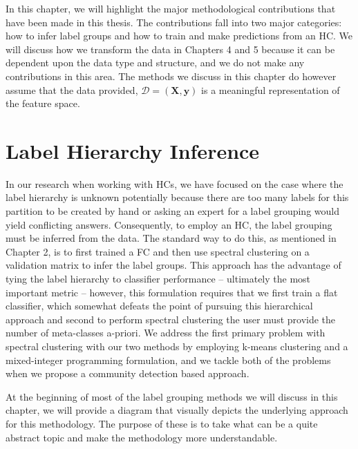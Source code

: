 \documentclass[../thesis.tex]{subfiles}
\begin{document}
In this chapter, we will highlight the major methodological contributions that
have been made in this thesis. The contributions fall into two major categories:
how to infer label groups and how to train and make predictions from an HC. We
will discuss how we transform the data in Chapters 4 and 5 because it can be
dependent upon the data type and structure, and we do not make any contributions
in this area. The methods we discuss in this chapter do however assume that the
data provided, $\mathcal{D} = (\mathbf{X}, \mathbf{y})$ is a meaningful
representation of the feature space.

\section{Label Hierarchy Inference}
In our research when working with HCs, we have focused on the case where the
label hierarchy is unknown potentially because there are too many labels for
this partition to be created by hand or asking an expert for a label grouping
would yield conflicting answers. Consequently, to employ an HC, the label
grouping must be inferred from the data. The standard way to do this, as
mentioned in Chapter 2, is to first trained a FC and then use spectral
clustering on a validation matrix to infer the label groups. This approach has
the advantage of tying the label hierarchy to classifier performance --
ultimately the most important metric -- however, this formulation requires that
we first train a flat classifier, which somewhat defeats the point of pursuing
this hierarchical approach and second to perform spectral clustering the user
must provide the number of meta-classes a-priori. We address the first primary
problem with spectral clustering with our two methods by employing k-means
clustering and a mixed-integer programming formulation, and we tackle both of
the problems when we propose a community detection based approach.

At the beginning of most of the label grouping methods we will discuss in this
chapter, we will provide a diagram that visually depicts the underlying approach
for this methodology. The purpose of these is to take what can be a quite
abstract topic and make the methodology more understandable.
\end{document}
